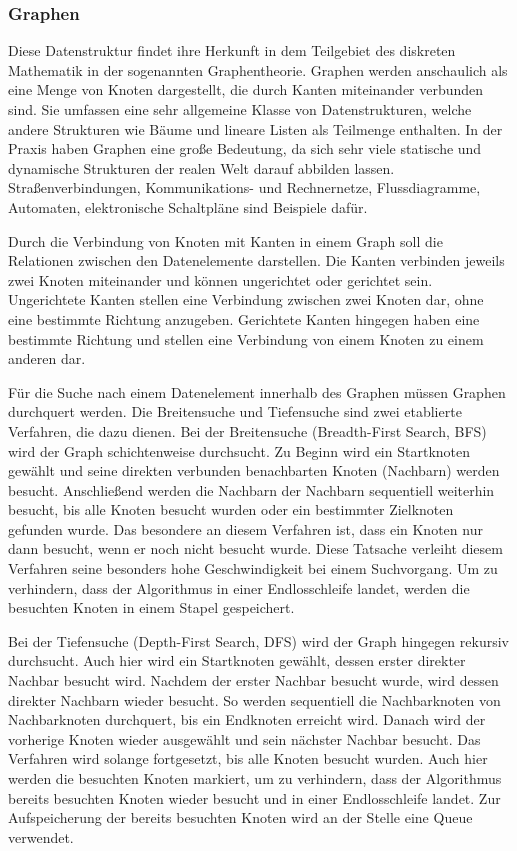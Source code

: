 \subsubsection{Graphen}
Diese Datenstruktur findet ihre Herkunft in dem Teilgebiet des diskreten Mathematik in der sogenannten Graphentheorie. Graphen werden anschaulich als eine Menge von Knoten dargestellt, die durch Kanten miteinander verbunden sind. Sie umfassen eine sehr allgemeine Klasse von Datenstrukturen, welche andere Strukturen wie Bäume und lineare Listen als Teilmenge enthalten. In der Praxis haben Graphen eine große Bedeutung, da sich sehr viele statische und dynamische Strukturen der realen Welt darauf abbilden lassen. Straßenverbindungen, Kommunikations- und Rechnernetze, Flussdiagramme, Automaten, elektronische Schaltpläne sind Beispiele dafür. \autocite[215]{knebl_algorithmen_2021} \autocite[654]{ernst_grundkurs_2020}

Durch die Verbindung von Knoten mit Kanten in einem Graph soll die Relationen zwischen den Datenelemente darstellen. Die Kanten verbinden jeweils zwei Knoten miteinander und können ungerichtet oder gerichtet sein. Ungerichtete Kanten stellen eine Verbindung zwischen zwei Knoten dar, ohne eine bestimmte Richtung anzugeben. Gerichtete Kanten hingegen haben eine bestimmte Richtung und stellen eine Verbindung von einem Knoten zu einem anderen dar. \autocite[221-222]{knebl_algorithmen_2021}

Für die Suche nach einem Datenelement innerhalb des Graphen müssen Graphen durchquert werden. Die Breitensuche und Tiefensuche sind zwei etablierte Verfahren, die dazu dienen. Bei der Breitensuche (Breadth-First Search, BFS) wird der Graph schichtenweise durchsucht. Zu Beginn wird ein Startknoten gewählt und seine direkten verbunden benachbarten Knoten (Nachbarn) werden besucht. Anschließend werden die Nachbarn der Nachbarn sequentiell weiterhin besucht, bis alle Knoten besucht wurden oder ein bestimmter Zielknoten gefunden wurde. Das besondere an diesem Verfahren ist, dass ein Knoten nur dann besucht, wenn er noch nicht besucht wurde. Diese Tatsache verleiht diesem Verfahren seine besonders hohe Geschwindigkeit bei einem Suchvorgang. Um zu verhindern, dass der Algorithmus in einer Endlosschleife landet, werden die besuchten Knoten in einem Stapel gespeichert. \autocite[227-228]{knebl_algorithmen_2021} \autocite[666]{ernst_grundkurs_2020}

Bei der Tiefensuche (Depth-First Search, DFS) wird der Graph hingegen rekursiv durchsucht. Auch hier wird ein Startknoten gewählt, dessen erster direkter Nachbar besucht wird. Nachdem der erster Nachbar besucht wurde, wird dessen direkter Nachbarn wieder besucht. So werden sequentiell die Nachbarknoten von Nachbarknoten durchquert, bis ein Endknoten erreicht wird. Danach wird der vorherige Knoten wieder ausgewählt und sein nächster Nachbar besucht. Das Verfahren wird solange fortgesetzt, bis alle Knoten besucht wurden. Auch hier werden die besuchten Knoten markiert, um zu verhindern, dass der Algorithmus bereits besuchten Knoten wieder besucht und in einer Endlosschleife landet. Zur Aufspeicherung der bereits besuchten Knoten wird an der Stelle eine Queue verwendet. \autocite[231-232]{knebl_algorithmen_2021} \autocite[666]{ernst_grundkurs_2020}

